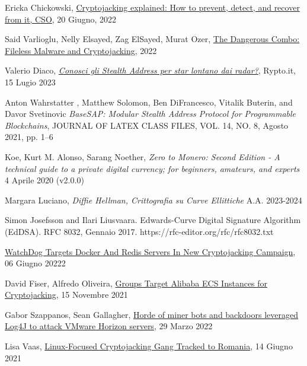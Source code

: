 \documentclass[12pt,a4paper]{article}
\begin{document}
\begin{thebibliography}{9}

Ericka Chickowski, \href{https://arc.net/l/quote/karbftmg}{Cryptojacking
explained: How to prevent, detect, and recover from it, CSO}, 20 Giugno, 2022

Said Varlioglu, Nelly Elsayed, Zag ElSayed, Murat Ozer,
\href{https://arc.net/l/quote/kbarlqni}{The Dangerous Combo: Fileless Malware
and Cryptojacking}, 2022

Valerio Diaco, \href{https://arc.net/l/quote/qirrmtbh}{\textit{Conosci gli
Stealth Address per star lontano dai radar?}}, Rypto.it, 15 Lugio 2023

Anton Wahrstatter , Matthew Solomon, Ben DiFrancesco, Vitalik Buterin, and Davor
Svetinovic \textit{BaseSAP: Modular Stealth Address Protocol for Programmable
Blockchains}, JOURNAL OF LATEX CLASS FILES, VOL. 14, NO. 8, Agosto 2021, pp. 1–6

Koe, Kurt M. Alonso, Sarang Noether, \textit{Zero to Monero: Second Edition - A
technical guide to a private digital currency; for beginners, amateurs, and
experts} 4 Aprile 2020 (v2.0.0)

Margara Luciano, \textit{Diffie Hellman, Crittografia su Curve Ellittiche} A.A.
2023-2024

Simon Josefsson and Ilari Liusvaara. Edwards-Curve Digital Signature Algorithm
(EdDSA). RFC 8032, Gennaio 2017. https://rfc-editor.org/rfc/rfc8032.txt

\href{https://cyware.com/news/watchdog-targets-docker-and-redis-servers-in-new-cryptojacking-campaign-a5681a92}{WatchDog
Targets Docker And Redis Servers In New Cryptojacking Campaign}, 06 Giugno 20222

David Fiser, Alfredo Oliveira,
\href{https://www.trendmicro.com/en_us/research/21/k/groups-target-alibaba-ecs-instances-for-cryptojacking.html}{Groups
Target Alibaba ECS Instances for Cryptojacking}, 15 Novembre 2021

Gabor Szappanos, Sean Gallagher,
\href{https://news.sophos.com/en-us/2022/03/29/horde-of-miner-bots-and-backdoors-leveraged-log4j-to-attack-vmware-horizon-servers/}{Horde
of miner bots and backdoors leveraged Log4J to attack VMware Horizon servers},
29 Marzo 2022

Lisa Vaas,
\href{https://threatpost.com/linux-cryptojacking-gang-romania/167783/}{Linux-Focused
Cryptojacking Gang Tracked to Romania}, 14 Giugno 2021

\end{thebibliography}
\end{document}
